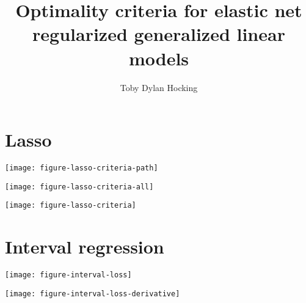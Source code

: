 \documentclass{article}
\begin{document}
\title{Optimality criteria for elastic net regularized generalized linear models}
\author{Toby Dylan Hocking}
\maketitle

\section{Lasso}

\texttt{[image: figure-lasso-criteria-path]}

\texttt{[image: figure-lasso-criteria-all]}

\texttt{[image: figure-lasso-criteria]}

\section{Interval regression}

\texttt{[image: figure-interval-loss]}

\texttt{[image: figure-interval-loss-derivative]}
\end{document}
